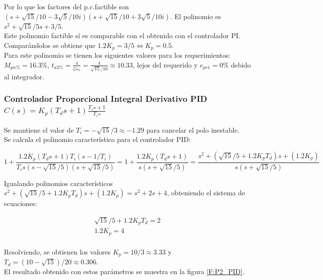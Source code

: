 \documentclass{report}
\begin{document}
Por lo que los factores del p.c.factible son \((s+\sqrt{15}/10-3\sqrt{5}/10 i)(s+\sqrt{15}/10+3\sqrt{5}/10 i) \). El polinomio es \(s^2+\sqrt{15}/5s+3/5\).\\

Este polinomio factible sí es comparable con el obtenido con el controlador PI. Comparándolos se obtiene que \(1.2K_p=3/5 \Leftrightarrow K_p = 0.5 \).\\

Para este polinomio se tienen los siguientes valores para los requerimientos:\\

\(M_{pn\%} = 16.3\%\), \(t_{a2\%} = \frac{4}{\zeta \omega_n} = \frac{4}{\sqrt{15}/10} \approx 10.33 \), lejos del requerido y \(e_{pr1}=0\%\) debido al integrador.\\


\subsubsection{Controlador Proporcional Integral Derivativo PID \(C(s) = K_p (T_ds+1)\frac{T_is+1}{T_is}\)}

Se mantiene el valor de \(T_i = -\sqrt{15}/3 \approx -1.29\) para cancelar el polo inestable.\\

Se calcula el polinomio característico para el controlador PID:

\begin{equation*}
    1 + \frac{1.2K_p(T_ds+1)T_i(s-1/T_i)}{T_is(s-\sqrt{15}/5)(s+\sqrt{15}/5)} = 1+ \frac{1.2K_p(T_ds+1)}{s(s+\sqrt{15}/5)} = \frac{s^2+(\sqrt{15}/5+1.2K_pT_d)s+(1.2K_p)}{s(s+\sqrt{15}/5)}
\end{equation*}

Igualando polinomios característicos \(s^2+(\sqrt{15}/5+1.2K_pT_d)s+(1.2K_p) = s^2+2s+4\), obteniendo el sistema de ecuaciones:

\begin{eqnarray*}
    \sqrt{15}/5+1.2K_pT_d  = 2 \\
    1.2K_p = 4 \\
\end{eqnarray*}

Resolviendo, se obtienen los valores \(K_p=10/3 \approx 3.33\) y \(T_d = (10-\sqrt{15})/20 \approx 0.306\).\\

El resultado obtenido con estos parámetros se muestra en la figura \ref{F:P2_PID}.\\
\end{document}
